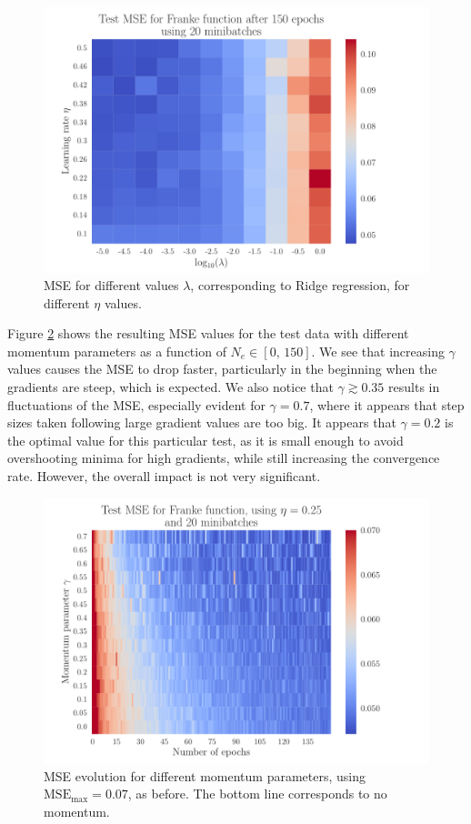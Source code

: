 \documentclass[12pt]{extarticle}
\begin{document}
\begin{figure}[h!]
	\includegraphics[width=0.9\linewidth]{SGD_Franke/reg_Franke__lambda_eta__Test_MSE__764274.pdf}
	\caption{MSE for different values $\lambda$, corresponding to Ridge regression, for different $\eta$ values.}
	\label{fig:SGD_Franke_lambda_eta}
\end{figure}


Figure \ref{fig:SGD_Franke_epochs_gamma} shows the resulting MSE values for the test data with different momentum parameters as a function of $N_e\in[0,\,150]$. We see that increasing $\gamma$ values causes the MSE to drop faster, particularly in the beginning when the gradients are steep, which is expected. We also notice that $\gamma\gtrsim0.35$ results in fluctuations of the MSE, especially evident for $\gamma=0.7$, where it appears that step sizes taken following large gradient values are too big. It appears that $\gamma=0.2$ is the optimal value for this particular test, as it is small enough to avoid overshooting minima for high gradients, while still increasing the convergence rate. However, the overall impact is not very significant.

\begin{figure}[h!]
	\includegraphics[width=0.9\linewidth]{SGD_Franke/reg_Franke__epochs_gamma__Test_MSE__239373.pdf}
	\caption{MSE evolution for different momentum parameters, using $\mathrm{MSE}_\mathrm{max}=0.07$, as before. The bottom line corresponds to no momentum.}
	\label{fig:SGD_Franke_epochs_gamma}
\end{figure}
\end{document}
